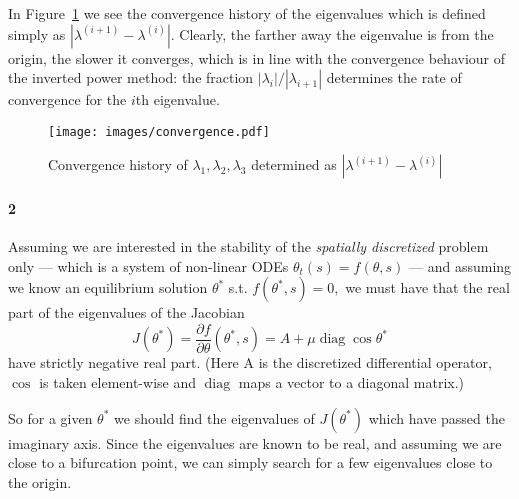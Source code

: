 \documentclass[a4paper]{article}
\DeclareMathOperator{\diag}{diag}
\begin{document}
  In Figure~\ref{fig:lambda_conv} we see the convergence history of the eigenvalues which is defined simply as $|\lambda^{(i + 1)} - \lambda^{(i)}|.$ Clearly, the farther away the eigenvalue is from the origin, the slower it converges, which is in line with the convergence behaviour of the inverted power method: the fraction $|\lambda_{i}| / |\lambda_{i+1}|$ determines the rate of convergence for the $i$th eigenvalue.

  \begin{figure}[h]
    \caption{Convergence history of $\lambda_1, \lambda_2, \lambda_3$ determined as $|\lambda^{(i+1)} - \lambda^{(i)}|$}\label{fig:lambda_conv}
    \centerline{\texttt{[image: images/convergence.pdf]}}
  \end{figure}

  \paragraph{2} Assuming we are interested in the stability of the \emph{spatially discretized} problem only --- which is a system of non-linear ODEs $\theta_t(s) = f(\theta, s)$ --- and assuming we know an equilibrium solution $\theta^*$ s.t. $f(\theta^*, s) = 0,$ we must have that the real part of the eigenvalues of the Jacobian $$J(\theta^*) = \frac{\partial f}{\partial \theta}(\theta^*, s) = A + \mu \diag \cos \theta^*$$ have strictly negative real part. (Here A is the discretized differential operator, $\cos$ is taken element-wise and $\diag$ maps a vector to a diagonal matrix.)

  So for a given $\theta^*$ we should find the eigenvalues of $J(\theta^*)$ which have passed the imaginary axis. Since the eigenvalues are known to be real, and assuming we are close to a bifurcation point, we can simply search for a few eigenvalues close to the origin.  
\end{document}
